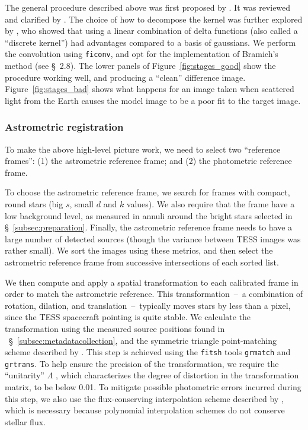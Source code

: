 \documentclass[12pt,twocolumn,tighten]{aastex62}
\begin{document}
The general procedure described above was first proposed by
\citet{Alard_Lupton_1998}.  It was reviewed and clarified by
\citet{miller_optimal_2008}.  The choice of how to decompose the
kernel was further explored by \citet{bramich_new_2008}, who showed
that using a linear combination of delta functions (also called a
``discrete kernel'') had advantages compared to a basis of gaussians.
We perform the convolution using \texttt{ficonv}, and opt for the
implementation of Bramich's method (see \citealt{Pal_2009} \S~2.8).
The lower panels of Figure~\ref{fig:stages_good} show the procedure
working well, and producing a ``clean'' difference image.
Figure~\ref{fig:stages_bad} shows what happens for an image taken when
scattered light from the Earth causes the model image to be a poor fit
to the target image.


\subsubsection{Astrometric registration}

To make the above high-level picture work, we need to select two
``reference frames'': (1) the astrometric reference frame; and (2) the
photometric reference frame.

To choose the astrometric reference frame, we search for frames with
compact, round stars (big $s$, small $d$ and $k$ values).  We also
require that the frame have a low background level, as measured in
annuli around the bright stars selected in
\S~\ref{subsec:preparation}.  Finally, the astrometric reference frame
needs to have a large number of detected sources (though the variance
between TESS images was rather small).  We sort the images using these
metrics, and then select the astrometric reference frame from
successive intersections of each sorted list.

We then compute and apply a spatial transformation 
to each calibrated frame in order to match the astrometric reference.
This transformation~--~a combination of rotation, dilation, and
translation~--~typically moves stars by less than a pixel, since the
TESS spacecraft pointing is quite stable.  We calculate the
transformation using the measured source positions found in
~\S~\ref{subsec:metadatacollection}, and the symmetric triangle
point-matching scheme described by \citet[][~\S~2.5.2]{Pal_2009}.
This step is achieved using the \texttt{fitsh} tools \texttt{grmatch}
and \texttt{grtrans}.  To help ensure the precision of the
transformation, we require the ``unitarity'' $\Lambda$
\citep[][~Eq.~54]{Pal_2009}, which characterizes the degree of
distortion in the transformation matrix, to be below 0.01.  To
mitigate possible photometric errors incurred during this step, we
also use the flux-conserving interpolation scheme described by
\citet{Pal_2009}, which is necessary because polynomial interpolation
schemes do not conserve stellar flux. 
\end{document}
